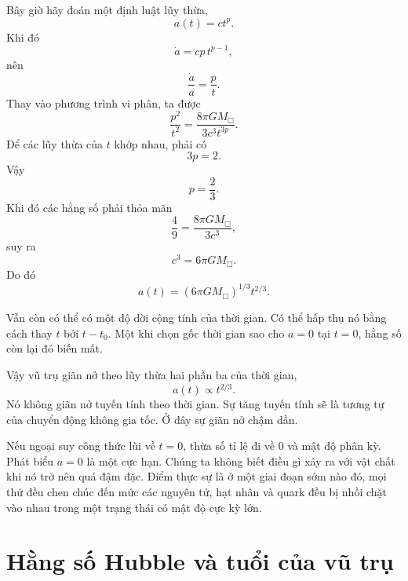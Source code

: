 Bây giờ hãy đoán một định luật lũy thừa,
\begin{equation}
a(t)=ct^p.
\end{equation}
Khi đó
\begin{equation}
\dot a = cp\,t^{p-1},
\end{equation}
nên
\begin{equation}
\frac{\dot a}{a}=\frac{p}{t}.
\end{equation}
Thay vào phương trình vi phân, ta được
\begin{equation}
\frac{p^2}{t^2}=\frac{8\pi G M_{\Box}}{3c^3t^{3p}}.
\end{equation}
Để các lũy thừa của \(t\) khớp nhau, phải có
\begin{equation}
3p=2.
\end{equation}
Vậy
\begin{equation}
p=\frac{2}{3}.
\end{equation}
Khi đó các hằng số phải thỏa mãn
\begin{equation}
\frac{4}{9}=\frac{8\pi G M_{\Box}}{3c^3},
\end{equation}
suy ra
\begin{equation}
c^3=6\pi G M_{\Box}.
\end{equation}
Do đó
\begin{equation}
a(t)=\left(6\pi G M_{\Box}\right)^{1/3}t^{2/3}.
\end{equation}

Vẫn còn có thể có một độ dời cộng tính của thời gian. Có thể hấp thụ nó bằng cách thay \(t\) bởi \(t-t_0\). Một khi chọn gốc thời gian sao cho \(a=0\) tại \(t=0\), hằng số còn lại đó biến mất.

Vậy vũ trụ giãn nở theo lũy thừa hai phần ba của thời gian,
\begin{equation}
a(t)\propto t^{2/3}.
\end{equation}
Nó không giãn nở tuyến tính theo thời gian. Sự tăng tuyến tính sẽ là tương tự của chuyển động không gia tốc. Ở đây sự giãn nở chậm dần.

Nếu ngoại suy công thức lùi về \(t=0\), thừa số tỉ lệ đi về 0 và mật độ phân kỳ. Phát biểu \(a=0\) là một cực hạn. Chúng ta không biết điều gì xảy ra với vật chất khi nó trở nên quá đậm đặc. Điểm thực sự là ở một giai đoạn sớm nào đó, mọi thứ đều chen chúc đến mức các nguyên tử, hạt nhân và quark đều bị nhồi chặt vào nhau trong một trạng thái có mật độ cực kỳ lớn.

\section{Hằng số Hubble và tuổi của vũ trụ}

